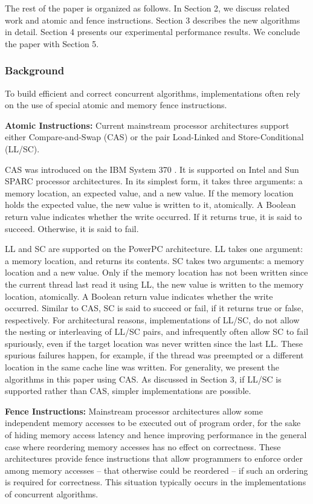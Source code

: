 The rest of the paper is organized as follows. In Section 2, we
discuss related work and atomic and fence instructions. Section 3
describes the new algorithms in detail. Section 4 presents our
experimental performance results. We conclude the paper with Section
5.

\subsubsection{Background}


To build efficient and correct concurrent algorithms, implementations
often rely on the use of special atomic and memory fence instructions.

\textbf{Atomic Instructions:} Current mainstream processor
architectures support either Compare-and-Swap (CAS) or the pair
Load-Linked and Store-Conditional (LL/SC).

CAS was introduced on the IBM System 370 \cite{IBM1974}. It is
supported on Intel and Sun SPARC processor architectures. In its
simplest form, it takes three arguments: a memory location, an
expected value, and a new value. If the memory location holds the
expected value, the new value is written to it, atomically. A Boolean
return value indicates whether the write occurred. If it returns true,
it is said to succeed. Otherwise, it is said to fail.

LL and SC are supported on the PowerPC architecture. LL takes one
argument: a memory location, and returns its contents. SC takes two
arguments: a memory location and a new value. Only if the memory
location has not been written since the current thread last read it
using LL, the new value is written to the memory location,
atomically. A Boolean return value indicates whether the write
occurred. Similar to CAS, SC is said to succeed or fail, if it returns
true or false, respectively. For architectural reasons,
implementations of LL/SC, do not allow the nesting or interleaving of
LL/SC pairs, and infrequently often allow SC to fail spuriously, even
if the target location was never written since the last LL. These
spurious failures happen, for example, if the thread was preempted or
a different location in the same cache line was written. For
generality, we present the algorithms in this paper using CAS. As
discussed in Section 3, if LL/SC is supported rather than CAS, simpler
implementations are possible.

\textbf{Fence Instructions:} Mainstream processor architectures allow
some independent memory accesses to be executed out of program order,
for the sake of hiding memory access latency and hence improving
performance in the general case where reordering memory accesses has
no effect on correctness. These architectures provide fence
instructions that allow programmers to enforce order among memory
accesses -- that otherwise could be reordered -- if such an ordering
is required for correctness. This situation typically occurs in the
implementations of concurrent algorithms.

